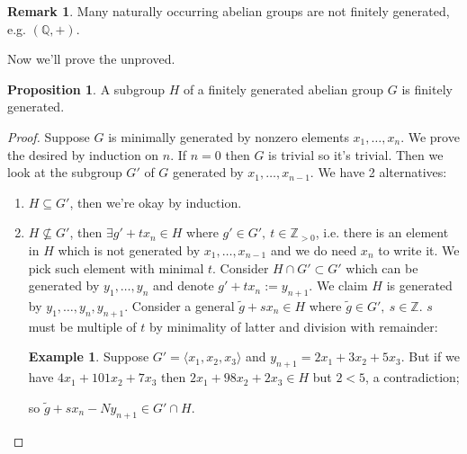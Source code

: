 \documentclass[a4paper]{article}
\theoremstyle{definition}
\newtheorem{prop}[defn]{Proposition}
\newtheorem{example}[defn]{Example}
\newtheorem*{remark}{Remark}
\begin{document}
\begin{remark}
Many naturally occurring abelian groups are not finitely generated, e.g. $(\mathbb Q,+)$.
\end{remark}
Now we'll prove the unproved.
\begin{prop}
A subgroup $H$ of a finitely generated abelian group $G$ is finitely generated.
\end{prop}
\begin{proof}
Suppose $G$ is minimally generated by nonzero elements $x_1,\ldots,x_n$. We prove the desired by induction on $n$. If $n=0$ then $G$ is trivial so it's trivial. Then we look at the subgroup $G'$ of $G$ generated by $x_1,\ldots,x_{n-1}$. We have 2 alternatives:
\begin{enumerate}
    \item $H\subseteq G'$, then we're okay by induction.
    \item $H\not\subseteq G'$, then $\exists g'+tx_n \in H$ where $g'\in G',\ t\in \mathbb Z_{>0}$, i.e. there is an element in $H$ which is not generated by $x_1,\ldots,x_{n-1}$ and we do need $x_n$ to write it. We pick such element with minimal $t$. Consider $H\cap G'\subset G'$ which can be generated by $y_1,\ldots,y_n$ and denote $g'+tx_n:= y_{n+1}$. We claim $H$ is generated by $y_1,\ldots,y_n,y_{n+1}$. Consider a general $\widetilde{g}+sx_n \in H$ where $\widetilde{g} \in G',\ s\in \mathbb Z$. $s$ must be multiple of $t$ by minimality of latter and division with remainder:
    \begin{example}
        Suppose $G'=\langle x_1,x_2,x_3\rangle$ and $y_{n+1}=2x_1+3x_2+5x_3$. But if we have $4x_1+101x_2+7x_3$ then $2x_1+98x_2+2x_3 \in H$ but $2<5$, a contradiction;
    \end{example}
    so $\widetilde{g}+sx_n-Ny_{n+1} \in G' \cap H$.
\end{enumerate}
\end{proof}
\end{document}
